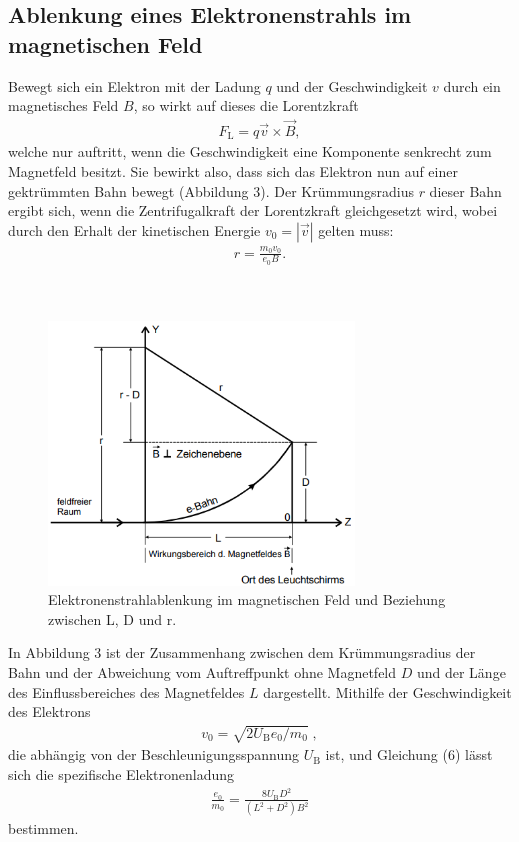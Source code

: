 \subsection{Ablenkung eines Elektronenstrahls im magnetischen Feld}
Bewegt sich ein Elektron mit der Ladung $q$ und der Geschwindigkeit $v$ durch ein magnetisches Feld $B$, so
wirkt auf dieses die Lorentzkraft
\begin{align}
F_\text{L} = q \vec{v} \times \vec{B},
\end{align}
welche nur auftritt, wenn die Geschwindigkeit eine Komponente senkrecht zum Magnetfeld besitzt.
Sie bewirkt also, dass sich das Elektron nun auf einer gektrümmten Bahn bewegt (Abbildung 3).
Der Krümmungsradius $r$ dieser Bahn ergibt sich, wenn die Zentrifugalkraft der Lorentzkraft gleichgesetzt
wird, wobei durch den Erhalt der kinetischen Energie $v_\text{0} = |\vec{v}|$ gelten muss:
\begin{align}
r = \frac{m_\text{0} v_\text{0}}{e_\text{0}B}.
\end{align}
\\~\\
\begin{figure}
  \centering
  \includegraphics[height=7cm]{ablenkung2.png}
  \caption{Elektronenstrahlablenkung im magnetischen Feld und Beziehung zwischen L, D und r. \cite[S.2]{kent2}}
\end{figure}
In Abbildung 3 ist der Zusammenhang zwischen dem Krümmungsradius der Bahn und der Abweichung
vom Auftreffpunkt ohne Magnetfeld $D$ und der Länge des Einflussbereiches des Magnetfeldes $L$
dargestellt.
Mithilfe der Geschwindigkeit des Elektrons 
\begin{align*}
v_\text{0} = \sqrt{2U_\text{B} e_\text{0} / m_\text{0}}\;,
\end{align*} die abhängig von der Beschleunigungsspannung $U_\text{B}$ ist, und Gleichung (6)
lässt sich die spezifische Elektronenladung
\begin{align}
\frac{e_\text{0}}{m_\text{0}} = \frac{8 U_\text{B} D^{2}}{(L^{2} + D^{2})B^{2}}
\end{align}
bestimmen.